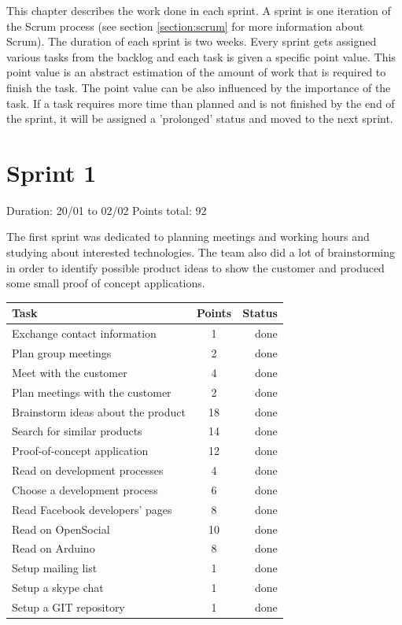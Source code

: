 
This chapter describes the work done in each sprint. A sprint is one iteration of the Scrum process
(see section \ref{section:scrum} for more information about Scrum). The duration of each sprint is two weeks.
Every sprint gets assigned various tasks from the backlog and each task is given a specific point value.
This point value is an abstract estimation of the amount of work that is required to finish the task.
The point value can be also influenced by the importance of the task. If a task requires more time than
planned and is not finished by the end of the sprint, it will be assigned a 'prolonged' status and
moved to the next sprint.

\newpage

\section{Sprint 1}

Duration: 20/01 to 02/02
Points total: 92

The first sprint was dedicated to planning meetings and working hours
and studying about interested technologies. The team also did a lot of
brainstorming in order to identify possible product ideas to show the
customer and produced some small proof of concept applications.

\begin{table}[ht!]
\begin{tabular}{ | l | c | r | }

\hline
\textbf{Task} & \textbf{Points} & \textbf{Status} \\
\hline

Exchange contact information		& 1  & done \\
\hline
Plan group meetings			& 2  & done \\
\hline
Meet with the customer			& 4  & done \\
\hline
Plan meetings with the customer		& 2  & done \\
\hline
Brainstorm ideas about the product	& 18 & done \\
\hline
Search for similar products		& 14 & done \\
\hline
Proof-of-concept application		& 12 & done \\
\hline
Read on development processes		& 4  & done \\
\hline
Choose a development process		& 6  & done \\
\hline
Read Facebook developers' pages		& 8  & done \\
\hline
Read on OpenSocial			& 10 & done \\
\hline
Read on Arduino				& 8  & done \\
\hline
Setup mailing list			& 1  & done \\
\hline
Setup a skype chat			& 1  & done \\
\hline
Setup a GIT repository			& 1  & done \\
\hline

\end{tabular}
\end{table}

